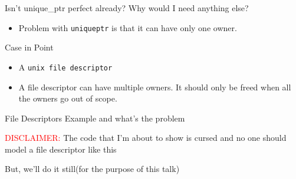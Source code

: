 \documentclass[
  10pt,
  ignorenonframetext,
]{beamer}
\providecommand{\tightlist}{%
  \setlength{\itemsep}{0pt}\setlength{\parskip}{0pt}}
\begin{document}
\begin{frame}{Isn't unique\_ptr perfect already?
Why would I need anything else?}
\protect\hypertarget{isnt-unique_ptr-perfect-already-why-would-i-need-anything-else}{}
\pause

\begin{itemize}
\tightlist
\item
  Problem with \texttt{unique\textunderscore ptr}
  is that it can have only one owner.
\end{itemize}

\pause

\begin{block}{Case in Point}
\protect\hypertarget{case-in-point}{}
\begin{itemize}
\tightlist
\item
  A \texttt{unix file descriptor}
\end{itemize}

\pause

\begin{itemize}
\tightlist
\item
  A file descriptor can have multiple owners. It
  should only be freed when all the owners go out
  of scope.
\end{itemize}
\end{block}
\end{frame}

\begin{frame}{File Descriptors Example and what's
the problem}
\protect\hypertarget{file-descriptors-example-and-whats-the-problem}{}
\pause

\centering \textcolor{red}{DISCLAIMER:} The code
that I'm about to show is cursed and no one should
model a file descriptor like this

\pause

\centering But, we'll do it still(for the purpose
of this talk)
\end{frame}
\end{document}
